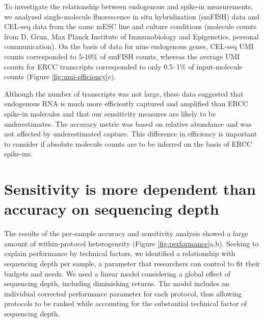 To investigate the relationship between endogenous and spike-in measurements, we analyzed single-molecule fluorescence in situ hybridization (smFISH) data and CEL-seq data from the same mESC line and culture conditions \cite{Grun2014-fx} (molecule counts from D. Grun, Max Planck Institute of Immunobiology and Epigenetics, personal communication). On the basis of data for nine endogenous genes, CEL-seq UMI counts corresponded to 5-10\% of smFISH counts, whereas the average UMI counts for ERCC transcripts corresponded to only 0.5–1\% of input-molecule counts (Figure \ref{fig:umi-efficiency}e).

Although the number of transcripts was not large, these data suggested that endogenous RNA is much more efficiently captured and amplified than ERCC spike-in molecules and that our sensitivity measures are likely to be underestimates. The accuracy metric was based on relative abundance and was not affected by underestimated capture. This difference in efficiency is important to consider if absolute molecule counts are to be inferred on the basis of ERCC spike-ins.

\section{Sensitivity is more dependent than accuracy on sequencing depth}

The results of the per-sample accuracy and sensitivity analysis showed a large amount of within-protocol heterogeneity (Figure \ref{fig:performance}a,b). Seeking to explain performance by technical factors, we identified a relationship with sequencing depth per sample, a parameter that researchers can control to fit their budgets and needs. We used a linear model considering a global effect of sequencing depth, including diminishing returns. The model includes an individual corrected performance parameter for each protocol, thus allowing protocols to be ranked while accounting for the substantial technical factor of sequencing depth.

